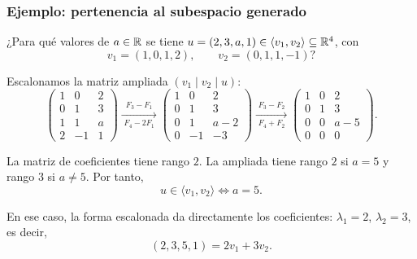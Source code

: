 \begin{frame}[allowframebreaks, t]
    \frametitle{Ejemplo: pertenencia al subespacio generado}

    \begin{example}
        ¿Para qué valores de $a\in\mathbb{R}$ se tiene
        $u=(2,3,a,1)\in\langle v_1,v_2\rangle\subseteq\mathbb{R}^4$, con
        \[
            v_1=(1,0,1,2),
            \qquad
            v_2=(0,1,1,-1)?
        \]
    \end{example}

    Escalonamos la matriz ampliada $(v_1\mid v_2\mid u)$:
    \[
        \left(\begin{array}{cc|c}
            1&0&2\\
            0&1&3\\
            1&1&a\\
            2&-1&1
        \end{array}\right)
        \xrightarrow[\;F_4-2F_1\;]{\;F_3-F_1\;}
        \left(\begin{array}{cc|c}
            1&0&2\\
            0&1&3\\
            0&1&a-2\\
            0&-1&-3
        \end{array}\right)
        \xrightarrow[\;F_4+F_2\;]{\;F_3-F_2\;}
        \left(\begin{array}{cc|c}
            1&0&2\\
            0&1&3\\
            0&0&a-5\\
            0&0&0
        \end{array}\right).
    \]

    \framebreak

    La matriz de coeficientes tiene rango $2$. La ampliada tiene rango $2$
    si $a=5$ y rango $3$ si $a\neq5$. Por tanto,
    \[
        u\in\langle v_1,v_2\rangle
        \iff
        a=5.
    \]

    \medskip

    En ese caso, la forma escalonada da directamente los coeficientes:
    $\lambda_1=2$, $\lambda_2=3$, es decir,
    \[
        (2,3,5,1)=2v_1+3v_2.
    \]
\end{frame}

